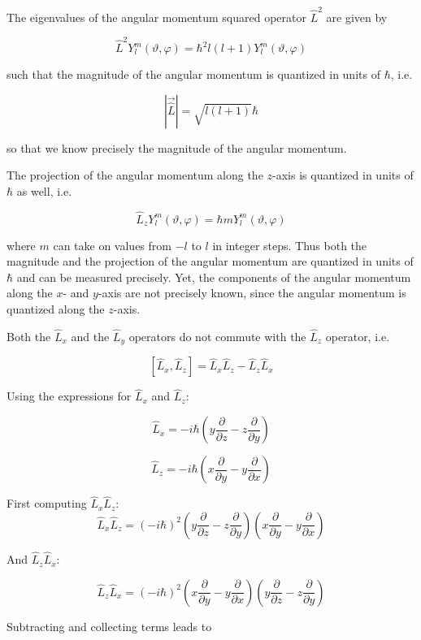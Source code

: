 \documentclass[
  a4paper,
]{book}
\begin{document}
The eigenvalues of the angular momentum squared operator \(\hat{L}^2\)
are given by

\[
\hat{L}^2 Y_l^m \left( \vartheta, \varphi \right) = \hbar^2 l \left( l+1 \right) Y_l^m \left( \vartheta, \varphi \right)
\]

such that the magnitude of the angular momentum is quantized in units of
\(\hbar\), i.e.

\[
\left| \vec{\hat{L}} \right| = \sqrt{l \left( l+1 \right)} \hbar
\]

so that we know precisely the magnitude of the angular momentum.

The projection of the angular momentum along the \(z\)-axis is quantized
in units of \(\hbar\) as well, i.e.

\[
\hat{L}_z Y_l^m \left( \vartheta, \varphi \right) = \hbar m Y_l^m \left( \vartheta, \varphi \right)
\]

where \(m\) can take on values from \(-l\) to \(l\) in integer steps.
Thus both the magnitude and the projection of the angular momentum are
quantized in units of \(\hbar\) and can be measured precisely. Yet, the
components of the angular momentum along the \(x\)- and \(y\)-axis are
not precisely known, since the angular momentum is quantized along the
\(z\)-axis.

Both the \(\hat{L}_x\) and the \(\hat{L}_y\) operators do not commute
with the \(\hat{L}_z\) operator, i.e.

\[[\hat{L}_x, \hat{L}_z] = \hat{L}_x \hat{L}_z - \hat{L}_z \hat{L}_x\]

Using the expressions for \(\hat{L}_x\) and \(\hat{L}_z\):

\[\hat{L}_x = -i\hbar\left(y\frac{\partial}{\partial z} - z\frac{\partial}{\partial y}\right)\]

\[\hat{L}_z = -i\hbar\left(x\frac{\partial}{\partial y} - y\frac{\partial}{\partial x}\right)\]

First computing \(\hat{L}_x \hat{L}_z\):
\[\hat{L}_x \hat{L}_z = (-i\hbar)^2\left(y\frac{\partial}{\partial z} - z\frac{\partial}{\partial y}\right)\left(x\frac{\partial}{\partial y} - y\frac{\partial}{\partial x}\right)\]

And \(\hat{L}_z \hat{L}_x\):

\[\hat{L}_z \hat{L}_x = (-i\hbar)^2\left(x\frac{\partial}{\partial y} - y\frac{\partial}{\partial x}\right)\left(y\frac{\partial}{\partial z} - z\frac{\partial}{\partial y}\right)\]

Subtracting and collecting terms leads to
\end{document}
